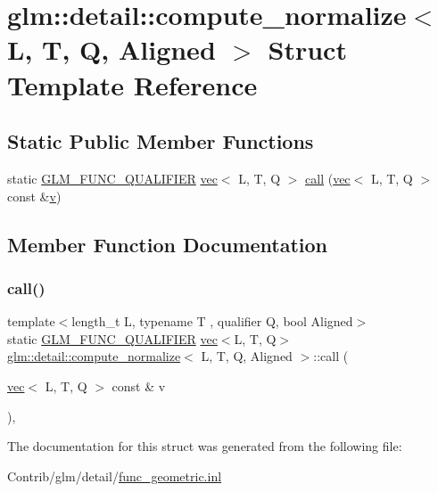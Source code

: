 \hypertarget{structglm_1_1detail_1_1compute__normalize}{}\section{glm\+:\+:detail\+:\+:compute\+\_\+normalize$<$ L, T, Q, Aligned $>$ Struct Template Reference}
\label{structglm_1_1detail_1_1compute__normalize}
\subsection*{Static Public Member Functions}
\begin{DoxyCompactItemize}
\item 
static \mbox{\hyperlink{setup_8hpp_a33fdea6f91c5f834105f7415e2a64407}{G\+L\+M\+\_\+\+F\+U\+N\+C\+\_\+\+Q\+U\+A\+L\+I\+F\+I\+ER}} \mbox{\hyperlink{structglm_1_1vec}{vec}}$<$ L, T, Q $>$ \mbox{\hyperlink{structglm_1_1detail_1_1compute__normalize_aa29b26ddafc5ea1e2c7798c0caf22ed2}{call}} (\mbox{\hyperlink{structglm_1_1vec}{vec}}$<$ L, T, Q $>$ const \&\mbox{\hyperlink{_s_d_l__opengl_8h_a10a82eabcb59d2fcd74acee063775f90}{v}})
\end{DoxyCompactItemize}


\subsection{Member Function Documentation}
\mbox{\label{structglm_1_1detail_1_1compute__normalize_aa29b26ddafc5ea1e2c7798c0caf22ed2}} 
\subsubsection{\texorpdfstring{call()}{call()}}
{\footnotesize\ttfamily template$<$length\+\_\+t L, typename T , qualifier Q, bool Aligned$>$ \\
static \mbox{\hyperlink{setup_8hpp_a33fdea6f91c5f834105f7415e2a64407}{G\+L\+M\+\_\+\+F\+U\+N\+C\+\_\+\+Q\+U\+A\+L\+I\+F\+I\+ER}} \mbox{\hyperlink{structglm_1_1vec}{vec}}$<$L, T, Q$>$ \mbox{\hyperlink{structglm_1_1detail_1_1compute__normalize}{glm\+::detail\+::compute\+\_\+normalize}}$<$ L, T, Q, Aligned $>$\+::call (\begin{DoxyParamCaption}\item[{\mbox{\hyperlink{structglm_1_1vec}{vec}}$<$ L, T, Q $>$ const \&}]{v }\end{DoxyParamCaption})\hspace{0.3cm}{\ttfamily [inline]}, {\ttfamily [static]}}



The documentation for this struct was generated from the following file\+:\begin{DoxyCompactItemize}
\item 
Contrib/glm/detail/\mbox{\hyperlink{func__geometric_8inl}{func\+\_\+geometric.\+inl}}\end{DoxyCompactItemize}
